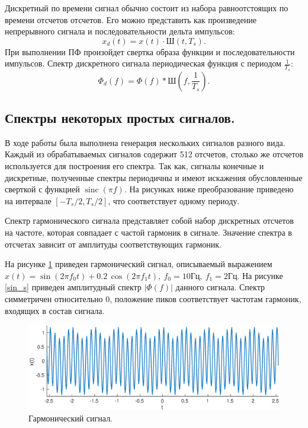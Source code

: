 \documentclass[a4paper,14pt]{extarticle}
\DeclareMathOperator{\sinc}{sinc}
\begin{document}
Дискретный по времени сигнал обычно состоит из набора равноотстоящих по времени отсчетов отсчетов. Его можно представить как произведение непрерывного сигнала и последовательности дельта импульсов:
\begin{equation*}
x_d(t) = x(t) \cdot \text{Ш}(t, T_s).
\end{equation*}
При выполнении ПФ произойдет свертка образа функции и последовательности импульсов. Спектр дискретного сигнала периодическая функция с периодом $\frac{1}{T_s}$:
\begin{equation*}
\Phi_d(f) = \Phi(f) * \text{Ш}(f, \frac{1}{T_s}).
\end{equation*}

\subsection{Спектры некоторых простых сигналов.}

В ходе работы была выполнена генерация нескольких сигналов разного вида. Каждый из обрабатываемых сигналов содержит 512 отсчетов, столько же отсчетов используется для построения его спектра. Так как, сигналы конечные и дискретные, полученные спектры периодичны и имеют искажения обусловленные сверткой с функцией $\sinc(\pi f)$. На рисунках ниже преобразование приведено на интервале $[-T_s / 2, T_s/2]$, что соответствует одному периоду.  


Спектр гармонического сигнала представляет собой набор дискретных отсчетов на частоте, которая совпадает с частой гармоник в сигнале. Значение спектра в отсчетах зависит от амплитуды соответствующих гармоник. 

На рисунке \ref{sin_x} приведен гармонический сигнал, описываемый выражением $x(t) = \sin(2 \pi f_0 t) + 0.2 \, \cos(2 \pi f_1 t), ~ f_0 = 10\text{Гц}, ~ f_1 = 2\text{Гц}$. На рисунке \ref{sin_s} приведен амплитудный спектр $|\Phi(f)|$ данного сигнала.	Спектр симметричен относительно 0, положение пиков соответствует частотам гармоник, входящих в состав сигнала. 

\begin{figure}[H]
\includegraphics[width=1\textwidth]{sin_x.eps}
\caption{Гармонический сигнал.}
\label{sin_x}
\end{figure}
\end{document}
